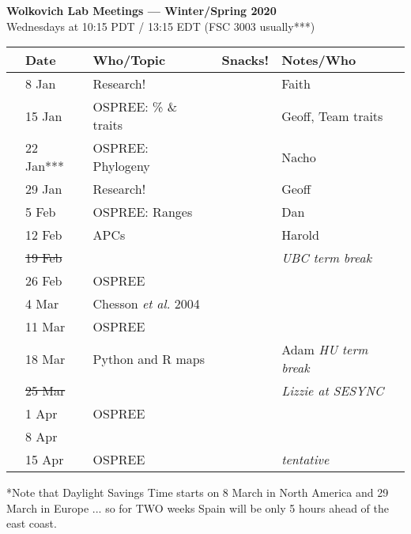 \documentclass[11pt]{article}
\begin{document}
 
\raggedright
{}

\begin{center} 
{\large \textbf{Wolkovich Lab Meetings --- Winter/Spring 2020}} \\ [2pt]
Wednesdays at 10:15 PDT / 13:15 EDT (FSC 3003 usually***)\\
\end{center} 

\begin{center}
\begin{tabular}{ p{0.2 cm}  p{2 cm}  p{5 cm}  p{2 cm}  p{4 cm} }  \hline \hline
 & \textbf{Date}
   & \textbf{Who/Topic}
      & \textbf{Snacks!} 
         & \textbf{Notes/Who} \\ 
\hline \hline
 & 8 Jan & Research! &       & Faith  \\\hline
 & 15 Jan & OSPREE: \% \& traits   &  & Geoff, Team traits \\\hline
 & 22 Jan*** & OSPREE: Phylogeny &      & Nacho \\\hline  
 & 29 Jan & Research! &       &  Geoff\\\hline
 & 5 Feb & OSPREE: Ranges &  & Dan \\\hline
 & 12 Feb & APCs &    & Harold\\\hline
 & \sout{19 Feb} & &       & \emph{UBC term break}   \\\hline 
 & 26 Feb  & OSPREE &       & \\\hline
 & 4 Mar & Chesson \emph{et al.} 2004 &   &     \\\hline
 & 11 Mar & OSPREE &       & \\\hline
 & 18 Mar & Python and R maps &       & Adam  \emph{HU term break} \\\hline
 & \sout{25 Mar} & &       &\emph{Lizzie at SESYNC}   \\\hline
 & 1 Apr & OSPREE&   & \\\hline
 & 8 Apr & &    & \\\hline
 & 15 Apr &OSPREE &    & \emph{tentative} \\\hline

\hline
\end{tabular}
\end{center}
*Note that Daylight Savings Time starts on 8 March in North America and 29 March in Europe ... so for TWO weeks Spain will be only 5 hours ahead of the east coast.\\
\end{document}

